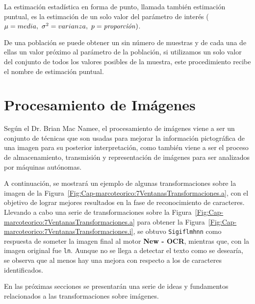 	\begin{defn}
  La estimación estadística en forma de punto, llamada también estimación 
  puntual, es la estimación de un solo valor del parámetro de interés 
  ($\mu = media,~ \sigma^2 = varianza,~ p=\text{\textit{proporción}})$.
    
  De una población se puede obtener un sin número de muestras y de cada una 
  de ellas un valor próximo al parámetro de la población, si utilizamos un 
  solo valor del conjunto de todos los valores posibles de la muestra, este 
  procedimiento recibe el nombre de estimación puntual.
  \end{defn}

\section{Procesamiento de Imágenes}
\label{sec:procesamiento-imagenes}
Según el Dr. Brian Mac Namee, el procesamiento de imágenes viene a ser un 
conjunto de técnicas que son usadas para mejorar la información pictográfica 
de una imagen para su posterior interpretación, como también viene a ser el 
proceso de almacenamiento, transmisión y representación de imágenes para ser 
analizados por máquinas autónomas.

A continuación, se mostrará un ejemplo de algunas transformaciones sobre la 
imagen de la Figura~\ref{Fig:Cap-marcoteorico:7VentanasTransformaciones.a}, 
con el objetivo de lograr mejores resultados en la fase de reconocimiento de 
caracteres. Llevando a cabo una serie de transformaciones sobre la 
Figura~\ref{Fig:Cap-marcoteorico:7VentanasTransformaciones.a} para obtener 
la Figura~\ref{Fig:Cap-marcoteorico:7VentanasTransformaciones.i}, se obtuvo 
\texttt{Sigiflmhnn} como respuesta de someter la imagen final al motor 
\textbf{New - OCR}, mientras que, con la imagen original fue \texttt{ln}. 
Aunque no se llega a detectar el texto como se desearía, se observa que al 
menos hay una mejora con respecto a los de caracteres identificados.

En las próximas secciones se presentarán una serie de ideas y fundamentos 
relacionados a las transformaciones sobre imágenes.

